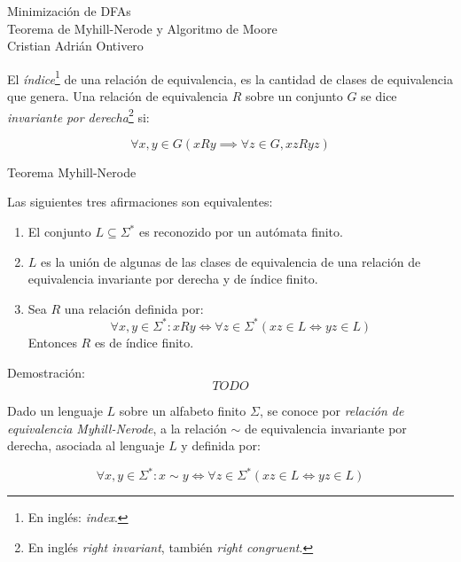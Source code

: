 \documentclass[spanish]{article}
\theoremstyle{definition}
\begin{document}
\begin{center}
  {\LARGE Minimización de DFAs \\[.3cm]
	Teorema de Myhill-Nerode y Algoritmo de Moore }\\[.2cm]
  Cristian Adrián Ontivero \\[.05cm]%
  \isodate
\end{center}

\vspace{0.2 cm}

El \textit{índice}\footnote{En inglés: \textit{index}. } de una relación de
equivalencia, es la cantidad de clases de equivalencia que genera. Una relación
de equivalencia $R$ sobre un conjunto $G$ se dice \textit{invariante por
derecha}\footnote{En inglés \textit{right invariant}, también \textit{right
congruent}.} si: 

\[ \forall x,y \in G (x R y \implies \forall z \in G, xz R yz)\]


Teorema Myhill-Nerode

Las siguientes tres afirmaciones son equivalentes:
\begin{enumerate}
  \item El conjunto $L \subseteq \Sigma^*$ es reconozido por un autómata finito.
  \item $L$ es la unión de algunas de las clases de equivalencia de una relación de equivalencia invariante por derecha y de índice finito. 
  \item Sea $R$ una relación definida por: 
	\[ \forall x, y \in \Sigma^* : xRy \iff \forall z \in \Sigma^*(xz \in L \iff yz \in L) \]
  Entonces $R$ es de índice finito.
\end{enumerate}

Demostración:
 \[ TODO \]


Dado un lenguaje $L$ sobre un alfabeto finito $\Sigma$, se conoce por
\textit{relación de equivalencia Myhill-Nerode}, a la relación $\sim$ de
equivalencia invariante por derecha, asociada al lenguaje $L$ y definida
por: 

\[ \forall x,y \in \Sigma^* : x \sim y \iff \forall z \in \Sigma^* (xz \in L \iff yz \in L)\]




\end{document}
